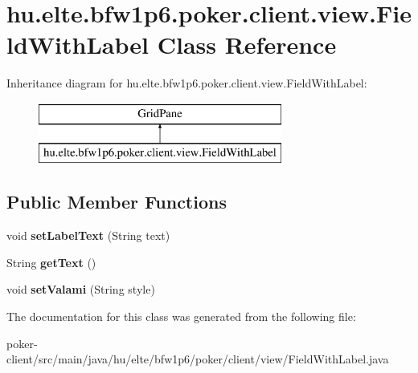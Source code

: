 \hypertarget{classhu_1_1elte_1_1bfw1p6_1_1poker_1_1client_1_1view_1_1_field_with_label}{}\section{hu.\+elte.\+bfw1p6.\+poker.\+client.\+view.\+Field\+With\+Label Class Reference}
\label{classhu_1_1elte_1_1bfw1p6_1_1poker_1_1client_1_1view_1_1_field_with_label}
Inheritance diagram for hu.\+elte.\+bfw1p6.\+poker.\+client.\+view.\+Field\+With\+Label\+:\begin{figure}[H]
\begin{center}
\leavevmode
\includegraphics[height=2.000000cm]{classhu_1_1elte_1_1bfw1p6_1_1poker_1_1client_1_1view_1_1_field_with_label}
\end{center}
\end{figure}
\subsection*{Public Member Functions}
\begin{DoxyCompactItemize}
\item 
\hypertarget{classhu_1_1elte_1_1bfw1p6_1_1poker_1_1client_1_1view_1_1_field_with_label_a2faf6ceb76467eb4304c05f7acaff75d}{}void {\bfseries set\+Label\+Text} (String text)\label{classhu_1_1elte_1_1bfw1p6_1_1poker_1_1client_1_1view_1_1_field_with_label_a2faf6ceb76467eb4304c05f7acaff75d}

\item 
\hypertarget{classhu_1_1elte_1_1bfw1p6_1_1poker_1_1client_1_1view_1_1_field_with_label_a3533b26a9144346fac634f259d504f49}{}String {\bfseries get\+Text} ()\label{classhu_1_1elte_1_1bfw1p6_1_1poker_1_1client_1_1view_1_1_field_with_label_a3533b26a9144346fac634f259d504f49}

\item 
\hypertarget{classhu_1_1elte_1_1bfw1p6_1_1poker_1_1client_1_1view_1_1_field_with_label_a3eea9b4bc853ca5a7590319270d8ef09}{}void {\bfseries set\+Valami} (String style)\label{classhu_1_1elte_1_1bfw1p6_1_1poker_1_1client_1_1view_1_1_field_with_label_a3eea9b4bc853ca5a7590319270d8ef09}

\end{DoxyCompactItemize}


The documentation for this class was generated from the following file\+:\begin{DoxyCompactItemize}
\item 
poker-\/client/src/main/java/hu/elte/bfw1p6/poker/client/view/Field\+With\+Label.\+java\end{DoxyCompactItemize}
